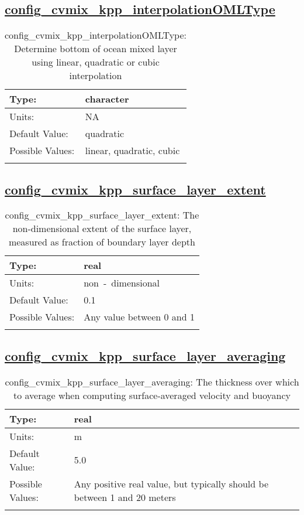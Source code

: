 \subsection[config\_cvmix\_kpp\_interpolationOMLType]{\hyperref[sec:nm_tab_cvmix]{config\_cvmix\_kpp\_interpolationOMLType}}
\label{subsec:nm_sec_config_cvmix_kpp_interpolationOMLType}
\begin{center}
\begin{longtable}{| p{2.0in} || p{4.0in} |}
    \hline
    Type: & character \\
    \hline
    Units: & \si{NA} \\
    \hline
    Default Value: & quadratic \\
    \hline
    Possible Values: & linear, quadratic, cubic \\
    \hline
    \caption{config\_cvmix\_kpp\_interpolationOMLType: Determine bottom of ocean mixed layer using linear, quadratic or cubic interpolation}
\end{longtable}
\end{center}
\subsection[config\_cvmix\_kpp\_surface\_layer\_extent]{\hyperref[sec:nm_tab_cvmix]{config\_cvmix\_kpp\_surface\_layer\_extent}}
\label{subsec:nm_sec_config_cvmix_kpp_surface_layer_extent}
\begin{center}
\begin{longtable}{| p{2.0in} || p{4.0in} |}
    \hline
    Type: & real \\
    \hline
    Units: & \si{non-dimensional} \\
    \hline
    Default Value: & 0.1 \\
    \hline
    Possible Values: & Any value between 0 and 1 \\
    \hline
    \caption{config\_cvmix\_kpp\_surface\_layer\_extent: The non-dimensional extent of the surface layer, measured as fraction of boundary layer depth}
\end{longtable}
\end{center}
\subsection[config\_cvmix\_kpp\_surface\_layer\_averaging]{\hyperref[sec:nm_tab_cvmix]{config\_cvmix\_kpp\_surface\_layer\_averaging}}
\label{subsec:nm_sec_config_cvmix_kpp_surface_layer_averaging}
\begin{center}
\begin{longtable}{| p{2.0in} || p{4.0in} |}
    \hline
    Type: & real \\
    \hline
    Units: & \si{m} \\
    \hline
    Default Value: & 5.0 \\
    \hline
    Possible Values: & Any positive real value, but typically should be between 1 and 20 meters \\
    \hline
    \caption{config\_cvmix\_kpp\_surface\_layer\_averaging: The thickness over which to average when computing surface-averaged velocity and buoyancy}
\end{longtable}
\end{center}
